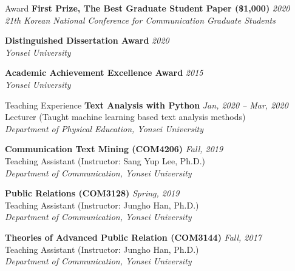 \documentclass{resume} %
\begin{document}

\begin{rSection}{Award}
{\bf First Prize, The Best Graduate Student Paper (\$1,000)} \hfill {\em 2020}\\
{\em 21th Korean National Conference for Communication Graduate Students}

{\bf Distinguished Dissertation Award} \hfill {\em 2020}\\
{\em Yonsei University}

{\bf Academic Achievement Excellence Award} \hfill {\em 2015}\\
{\em Yonsei University}
\end{rSection}


\begin{rSection}{Teaching Experience}
{\bf Text Analysis with Python} \hfill {\em Jan, 2020 -- Mar, 2020}\\
Lecturer (Taught machine learning based text analysis methods)\\
{\em Department of Physical Education, Yonsei University}

{\bf Communication Text Mining (COM4206)} \hfill {\em Fall, 2019}\\
Teaching Assistant (Instructor: Sang Yup Lee, Ph.D.)\\
{\em Department of Communication, Yonsei University}

{\bf Public Relations (COM3128)} \hfill {\em Spring, 2019}\\
Teaching Assistant (Instructor: Jungho Han, Ph.D.)\\
{\em Department of Communication, Yonsei University}

{\bf Theories of Advanced Public Relation (COM3144)} \hfill {\em Fall, 2017}\\
Teaching Assistant (Instructor: Jungho Han, Ph.D.)\\
{\em Department of Communication, Yonsei University}
\end{rSection}

\end{document}
